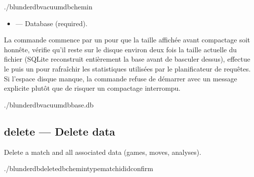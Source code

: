\documentclass[letterpaper,10pt,english]{sphinxmanual}
\begin{document}
\begin{sphinxVerbatim}[commandchars=\\\{\}]
./blunderdbvacuum\PYGZhy{}\PYGZhy{}db\PYGZlt{}chemin\PYGZgt{}
\end{sphinxVerbatim}

\sphinxAtStartPar
{}
\begin{itemize}
\item {} 
\sphinxAtStartPar
{} — Database (required).

\end{itemize}

\sphinxAtStartPar
La commande commence par un  pour que la taille
affichée avant compactage soit honnête, vérifie qu’il reste sur le disque
environ deux fois la taille actuelle du fichier (SQLite reconstruit
entièrement la base avant de basculer dessus), effectue le  puis un
 pour rafraîchir les statistiques utilisées par le planificateur de
requêtes. Si l’espace disque manque, la commande refuse de démarrer avec un
message explicite plutôt que de risquer un compactage interrompu.

\sphinxAtStartPar
{}

\begin{sphinxVerbatim}[commandchars=\\\{\}]
./blunderdbvacuum\PYGZhy{}\PYGZhy{}dbbase.db

\end{sphinxVerbatim}


\subsection{delete — Delete data}
\label{\detokenize{cli:delete-supprimer-des-donnees}}
\sphinxAtStartPar
Delete a match and all associated data (games, moves, analyses).

\begin{sphinxVerbatim}[commandchars=\\\{\}]
./blunderdbdelete\PYGZhy{}\PYGZhy{}db\PYGZlt{}chemin\PYGZgt{}\PYGZhy{}\PYGZhy{}typematch\PYGZhy{}\PYGZhy{}id\PYGZlt{}id\PYGZgt{}\PYG{o}{[}\PYGZhy{}\PYGZhy{}confirm\PYG{o}{]}
\end{sphinxVerbatim}
\end{document}
